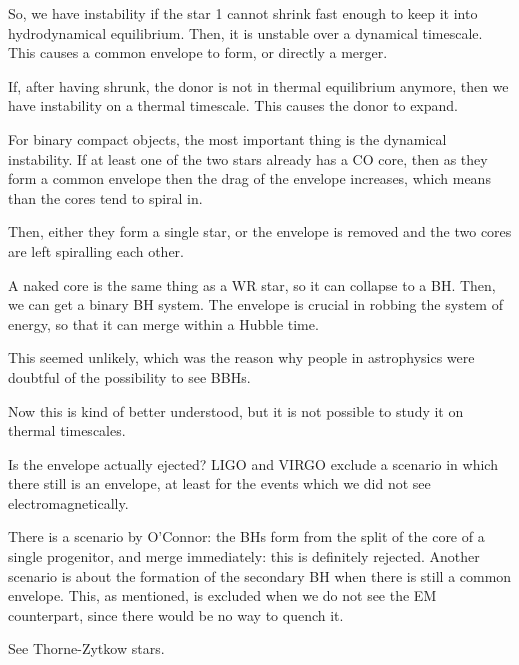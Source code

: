 \documentclass[main.tex]{subfiles}
\begin{document}
So, we have instability if the star 1 cannot shrink fast enough to keep it into hydrodynamical equilibrium. 
Then, it is unstable over a dynamical timescale. This causes a common envelope to form, or directly a merger. 

If, after having shrunk, the donor is not in thermal equilibrium anymore, then we have instability on a thermal timescale. 
This causes the donor to expand. 

For binary compact objects, the most important thing is the dynamical instability. 
If at least one of the two stars already has a CO core, then as they form a common envelope then the drag of the envelope increases, which means than the cores tend to spiral in. 

Then, either they form a single star, or the envelope is removed and the two cores are left spiralling each other. 

A naked core is the same thing as a WR star, so it can collapse to a BH. 
Then, we can get a binary BH system.
The envelope is crucial in robbing the system of energy, so that it can merge within a Hubble time. 

This seemed unlikely, which was the reason why people in astrophysics were doubtful of the possibility to see BBHs. 

Now this is kind of better understood, but it is not possible to study it on thermal timescales.

Is the envelope actually ejected? 
LIGO and VIRGO exclude a scenario in which there still is an envelope, at least for the events which we did not see electromagnetically. 

There is a scenario by O'Connor: the BHs form from the split of the core of a single progenitor, and merge immediately: this is definitely rejected.
Another scenario is about the formation of the secondary BH when there is still a common envelope. This, as mentioned, is excluded when we do not see the EM counterpart, since there would be no way to quench it. 

See Thorne-Zytkow stars. 
\end{document}
